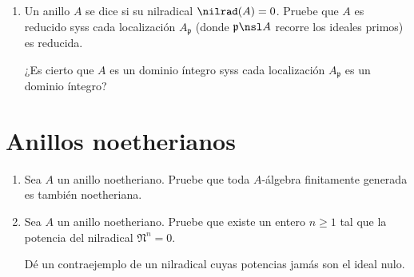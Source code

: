 \documentclass[11pt, reqno]{amsart}
\begin{document}
\begin{enumerate}
	\item Un anillo $A$ se dice  si su nilradical $\nilrad(A) = 0$.
		Pruebe que $A$ es reducido syss cada localización $A_{\mathfrak{p}}$ (donde $\mathfrak{p} \nsl A$
		recorre los ideales primos) es reducida.

		\begin{prob}
			\lookup
			¿Es cierto que $A$ es un dominio íntegro syss cada localización $A_{\mathfrak{p}}$ es un dominio
			íntegro?
		\end{prob}
\end{enumerate}

\section{Anillos noetherianos}
\begin{enumerate}[resume]
	\item Sea $A$ un anillo noetheriano.
		Pruebe que toda $A$-álgebra finitamente generada es también noetheriana.
	\item Sea $A$ un anillo noetheriano. 
		Pruebe que existe un entero $n \ge 1$ tal que la potencia del nilradical $\mathfrak{N}^n = 0$.

		\begin{prob}
			\lookup
			Dé un contraejemplo de un nilradical cuyas potencias jamás son el ideal nulo.
		\end{prob}
\end{enumerate}

\appendix
\end{document}
